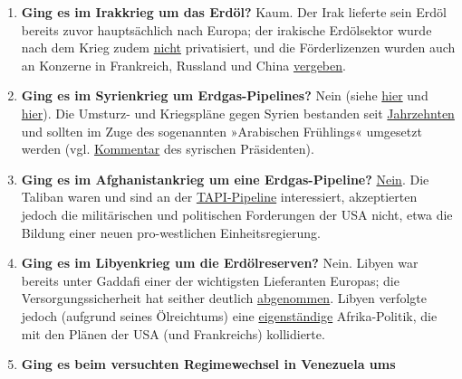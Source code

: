\begin{enumerate}
  \begin{enumerate}
  \def\labelenumii{\arabic{enumii}.}
  \tightlist
  \item
    \textbf{Ging es im Irakkrieg um das Erdöl?} Kaum. Der Irak lieferte
    sein Erdöl bereits zuvor hauptsächlich nach Europa; der irakische
    Erdölsektor wurde nach dem Krieg zudem
    \href{https://theconversation.com/iraq-what-happened-to-the-oil-after-the-war-62188}{nicht}
    privatisiert, und die Förderlizenzen wurden auch an Konzerne in
    Frankreich, Russland und China
    \href{https://www.reuters.com/article/us-iraq-oil-contracts/oil-companies-temper-iraqs-dreams-of-production-expansion-idUSKCN1GQ1ID}{vergeben}.
  \item
    \textbf{Ging es im Syrienkrieg um Erdgas-Pipelines?} Nein (siehe
    \href{https://truthout.org/articles/the-war-against-the-assad-regime-is-not-a-pipeline-war/}{hier}
    und
    \href{https://www.middleeasteye.net/big-story/pipelineistan-conspiracy-war-syria-has-never-been-about-gas}{hier}).
    Die Umsturz- und Kriegspläne gegen Syrien bestanden seit
    \href{https://www.globalresearch.ca/syrian-regime-change-a-70-year-project/5636433}{Jahrzehnten}
    und sollten im Zuge des sogenannten »Arabischen Frühlings« umgesetzt
    werden (vgl. \href{https://youtu.be/flaqLAp0Yp4?t=1674}{Kommentar}
    des syrischen Präsidenten).
  \item
    \textbf{Ging es im Afghanistankrieg um eine Erdgas-Pipeline?}
    \href{https://slate.com/culture/2001/12/is-the-afghan-war-about-an-oil-pipeline.html}{Nein}.
    Die Taliban waren und sind an der
    \href{https://en.wikipedia.org/wiki/Turkmenistan\%E2\%80\%93Afghanistan\%E2\%80\%93Pakistan\%E2\%80\%93India_Pipeline}{TAPI-Pipeline}
    interessiert, akzeptierten jedoch die militärischen und politischen
    Forderungen der USA nicht, etwa die Bildung einer neuen
    pro-westlichen Einheitsregierung.
  \item
    \textbf{Ging es im Libyenkrieg um die Erdölreserven?} Nein. Libyen
    war bereits unter Gaddafi einer der wichtigsten Lieferanten Europas;
    die Versorgungssicherheit hat seither deutlich
    \href{http://www.businessinsider.com/r-how-unstable-is-libyas-oil-production-2018-3}{abgenommen}.
    Libyen verfolgte jedoch (aufgrund seines Ölreichtums) eine
    \href{https://globalresearch.ca/libya-a-war-on-africa/26474}{eigenständige}
    Afrika-Politik, die mit den Plänen der USA (und Frankreichs)
    kollidierte.
  \item
    \textbf{Ging es beim versuchten Regimewechsel in Venezuela ums
}
\end{enumerate}
\end{enumerate}
